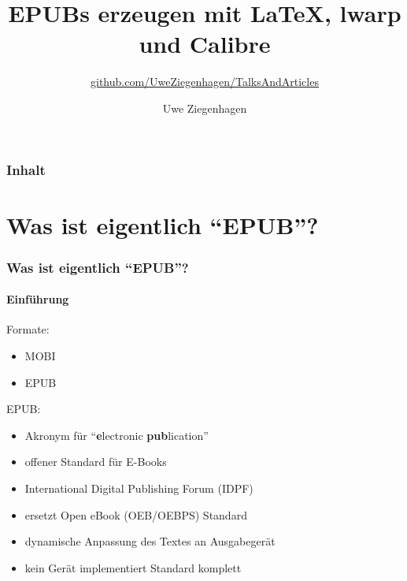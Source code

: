 \documentclass[12pt,ngerman]{beamer}
\author{Uwe Ziegenhagen}
\title{EPUBs erzeugen mit LaTeX, lwarp und Calibre}
\subtitle{\url{github.com/UweZiegenhagen/TalksAndArticles}}
\begin{document}
\begin{frame}

\maketitle

\end{frame}

\begin{frame}
\frametitle{Inhalt}

\tableofcontents

\end{frame}

\section{Was ist eigentlich \enquote{EPUB}?}

\begin{frame}
\frametitle{Was ist eigentlich \enquote{EPUB}?}
\framesubtitle{Einführung}

Formate:

\begin{itemize}
	\item MOBI
	\item EPUB
\end{itemize}

EPUB:

\begin{itemize}
\item Akronym für \enquote{\textbf{e}lectronic \textbf{pub}lication}
\item offener Standard für E-Books 
\item International Digital Publishing Forum (IDPF)
\item ersetzt Open eBook (OEB/OEBPS) Standard
\item dynamische Anpassung des Textes an Ausgabegerät
\item kein Gerät implementiert Standard komplett
\end{itemize}

\end{frame}
\end{document}
